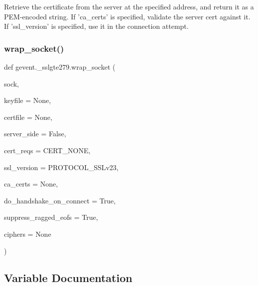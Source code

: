 \begin{DoxyVerb}Retrieve the certificate from the server at the specified address,
and return it as a PEM-encoded string.
If 'ca_certs' is specified, validate the server cert against it.
If 'ssl_version' is specified, use it in the connection attempt.\end{DoxyVerb}
 \mbox{\label{namespacegevent_1_1__sslgte279_affdbe49ecfb55ee9d3aa0bfd562b7ecf}} 
\subsubsection{\texorpdfstring{wrap\+\_\+socket()}{wrap\_socket()}}
{\footnotesize\ttfamily def gevent.\+\_\+sslgte279.\+wrap\+\_\+socket (\begin{DoxyParamCaption}\item[{}]{sock,  }\item[{}]{keyfile = {\ttfamily None},  }\item[{}]{certfile = {\ttfamily None},  }\item[{}]{server\+\_\+side = {\ttfamily False},  }\item[{}]{cert\+\_\+reqs = {\ttfamily CERT\+\_\+NONE},  }\item[{}]{ssl\+\_\+version = {\ttfamily PROTOCOL\+\_\+SSLv23},  }\item[{}]{ca\+\_\+certs = {\ttfamily None},  }\item[{}]{do\+\_\+handshake\+\_\+on\+\_\+connect = {\ttfamily True},  }\item[{}]{suppress\+\_\+ragged\+\_\+eofs = {\ttfamily True},  }\item[{}]{ciphers = {\ttfamily None} }\end{DoxyParamCaption})}



\subsection{Variable Documentation}
\mbox{\label{namespacegevent_1_1__sslgte279_a533dbd6f25478242a5aea158a3c94a38}} 
